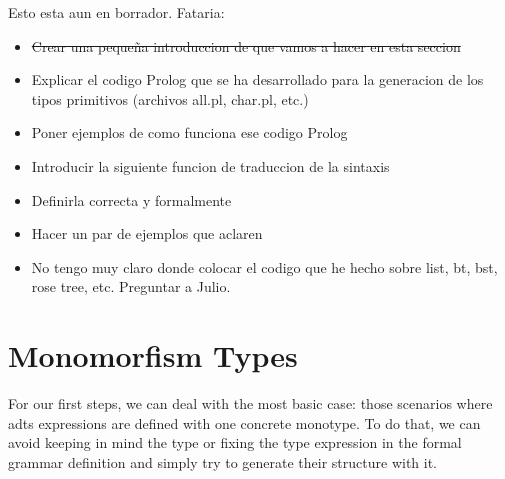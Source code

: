 \documentclass{report}
\theoremstyle{definition}
\theoremstyle{definition}
\begin{document}
Esto esta aun en borrador. Fataria:
\begin{itemize}
	\item \sout{Crear una pequeña introduccion de que vamos a hacer en esta seccion}
	\item Explicar el codigo Prolog que se ha desarrollado para la generacion de los tipos primitivos (archivos all.pl, char.pl, etc.)
	\item Poner ejemplos de como funciona ese codigo Prolog
	\item Introducir la siguiente funcion de traduccion de la sintaxis
	\item Definirla correcta y formalmente
	\item Hacer un par de ejemplos que aclaren
	\item No tengo muy claro donde colocar el codigo que he hecho sobre list, bt, bst, rose tree, etc. Preguntar a Julio.
\end{itemize}
\pagebreak

\section{Monomorfism Types}

For our first steps, we can deal with the most basic case: those scenarios where adts expressions are defined with one concrete monotype. To do that, we can avoid keeping in mind the type or fixing the type expression in the formal grammar definition and simply try to generate their structure with it.\\
\end{document}
